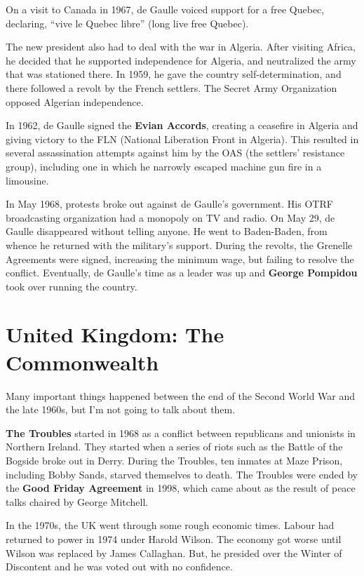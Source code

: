 On a visit to Canada in 1967, de Gaulle voiced support for a free Quebec,
declaring, ``vive le Quebec libre'' (long live free Quebec).

The new president also had to deal with the war in Algeria.
After visiting Africa, he decided that he supported independence for Algeria,
and neutralized the army that was stationed there.
In 1959, he gave the country self-determination,
and there followed a revolt by the French settlers.
The Secret Army Organization opposed Algerian independence.

In 1962, de Gaulle signed the \textbf{Evian Accords},
creating a ceasefire in Algeria and giving victory to the FLN
(National Liberation Front in Algeria).
This resulted in several assassination attempts against him by the OAS
(the settlers' resistance group),
including one in which he narrowly escaped machine gun fire in a limousine.

In May 1968, protests broke out against de Gaulle's government.
His OTRF broadcasting organization had a monopoly on TV and radio.
On May 29, de Gaulle disappeared without telling anyone.
He went to Baden-Baden, from whence he returned with the military's support.
During the revolts, the Grenelle Agreements were signed, increasing the minimum wage,
but failing to resolve the conflict.
Eventually,
de Gaulle's time as a leader was up and \textbf{George Pompidou} took over running the country.

\section{United Kingdom: The Commonwealth}

Many important things happened between the end of the Second World War and the late 1960s,
but I'm not going to talk about them.

\textbf{The Troubles} started in 1968
as a conflict between republicans and unionists in Northern Ireland.
They started when a series of riots such as the Battle of the Bogside broke out in Derry.
During the Troubles, ten inmates at Maze Prison, including Bobby Sands,
starved themselves to death.
The Troubles were ended by the \textbf{Good Friday Agreement} in 1998,
which came about as the result of peace talks chaired by George Mitchell.

In the 1970s, the UK went through some rough economic times.
Labour had returned to power in 1974 under Harold Wilson.
The economy got worse until Wilson was replaced by James Callaghan.
But, he presided over the Winter of Discontent and he was voted out with no confidence.

